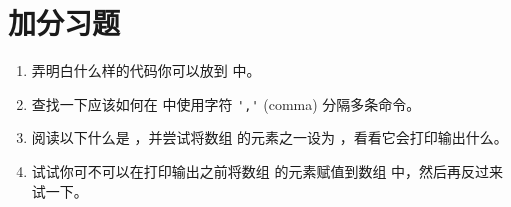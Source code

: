 \section{加分习题}

\begin{enumerate}
\item 弄明白什么样的代码你可以放到  中。
\item 查找一下应该如何在  中使用字符 \verb|','| (comma) 分隔多条命令。
\item 阅读以下什么是 ，并尝试将数组  的元素之一设为 
，看看它会打印输出什么。 
\item 试试你可不可以在打印输出之前将数组  的元素赋值到数组 
 中，然后再反过来试一下。
\end{enumerate}


